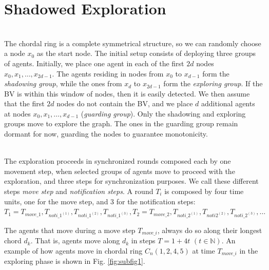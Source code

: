 \section{Shadowed Exploration}
\\
The chordal ring is a complete symmetrical structure, so we can randomly choose a node $x_0$ as the start node.  The initial setup consists of deploying three groups of agents.
Initially, we place one  agent in each of the first $2d$ nodes   $x_0, x_1, \ldots , x_{2d-1}$. 
The agents residing in nodes from $x_0$ to $x_{d-1}$ form the  {\em shadowing group}, while the ones from $x_d$ to $x_{2d-1}$ form the {\em exploring group}. 
If the BV is within this window of nodes, then it is easily detected. We then assume that the  first $2d$ nodes do not contain the BV, and we place $d$ additional agents at nodes $x_ 0,x_1, \ldots, x_{d-1}$ ({\em guarding group}). 
Only the shadowing and exploring groups move to explore the graph. The ones in the guarding group remain dormant for now, guarding the nodes to guarantee monotonicity. 

\\
The exploration proceeds in synchronized rounds composed each by  one movement step, when selected groups of agents move to proceed with the exploration, and three steps for synchronization purposes. We call these different steps {\em move step}  and  {\em notification steps}. A round $T_i$ is composed by four time units, one for the move step, and 3 for the notification steps: $T_1 = T_{move\_1},T_{noti\_1^{(1)}},T_{noti\_1^{(2)}},T_{noti\_1^{(3)}},  T_2 = T_{move\_2},T_{noti\_2^{(1)}},T_{noti2^{(2)}},T_{noti\_2^{(3)}},\ldots$

% 
%
%
The agents that move during a move step $T_{move\_i}$, always do so along their longest chord $d_k$. That is, agents move along $d_k$ in steps $T=1+4t$ $(t\in \mathbb{N})$.  
An example of how agents move in chordal ring $C_n(1, 2 , 4, 5)$ at time $T_{move\_i}$ in the  exploring phase is shown in Fig. \ref{fig:subfig1}. \\

